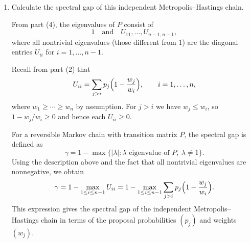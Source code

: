 \documentclass[answers,12pt,addpoints]{exam}
\begin{document}
\begin{enumerate}
\begin{solution}
Because $P$ is a Markov transition matrix, it must have eigenvalue $1$;
therefore $\lambda_n(U) + 1 = 1$ and $\lambda_n(U) = 0$. The remaining
eigenvalues of $P$ are exactly the other diagonal entries of $U$:
\[
\lambda_i(P) = U_{ii},\qquad i = 1,\dots,n-1,
\]
up to a relabeling of indices. In particular, the full multiset of eigenvalues
of $P$ is
\[
\{1\} \cup \{U_{11},\dots,U_{n-1,n-1}\}.
\]
\end{solution}
\item Calculate the spectral gap of this independent Metropolis--Hastings chain.
\begin{solution}
From part (4), the eigenvalues of $P$ consist of
\[
1 \quad\text{and}\quad U_{11},\dots,U_{n-1,n-1},
\]
where all nontrivial eigenvalues (those different from $1$) are the diagonal
entries $U_{ii}$ for $i = 1,\dots,n-1$.

Recall from part (2) that
\[
U_{ii} = \sum_{j > i} p_j \Bigl(1 - \frac{w_j}{w_i}\Bigr),
\qquad i = 1,\dots,n,
\]
where $w_1 \ge \cdots \ge w_n$ by assumption. For $j>i$ we have
$w_j \le w_i$, so $1 - w_j/w_i \ge 0$ and hence each $U_{ii} \ge 0$.

For a reversible Markov chain with transition matrix $P$, the spectral gap
is defined as
\[
\gamma
= 1 - \max\{|\lambda| : \lambda \text{ eigenvalue of } P,\ \lambda \neq 1\}.
\]
Using the description above and the fact that all nontrivial eigenvalues are
nonnegative, we obtain
\[
\gamma
= 1 - \max_{1 \le i \le n-1} U_{ii}
= 1 - \max_{1 \le i \le n-1}
\sum_{j > i} p_j \Bigl(1 - \frac{w_j}{w_i}\Bigr).
\]
This expression gives the spectral gap of the independent
Metropolis--Hastings chain in terms of the proposal probabilities $(p_j)$ and
weights $(w_j)$.
\end{solution}
\end{enumerate}
\end{document}
